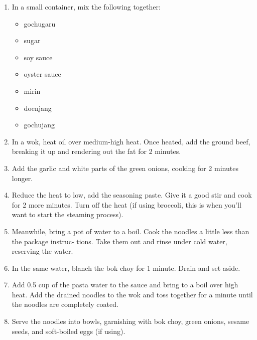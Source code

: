 \begin{enumerate}
\item In a small container, mix the following together:
\begin{itemize}
    \item gochugaru
    \item sugar
    \item soy sauce
    \item oyster sauce
    \item mirin
    \item doenjang
    \item gochujang
\end{itemize}
\item In a wok, heat oil over medium-high heat. Once heated, add the ground beef, breaking it up and rendering out the
    fat for 2 minutes.
\item Add the garlic and white parts of the green onions, cooking for 2 minutes longer.
\item Reduce the heat to low, add the seasoning paste. Give it a good stir and cook for 2 more minutes.  Turn off the
    heat (if using broccoli, this is when you’ll want to start the steaming process).
\item Meanwhile, bring a pot of water to a boil. Cook the noodles a little less than the package instruc- tions. Take
    them out and rinse under cold water, reserving the water.
\item In the same water, blanch the bok choy for 1 minute. Drain and set aside.
\item Add 0.5 cup of the pasta water to the sauce and bring to a boil over high heat. Add the drained noodles to the wok
    and toss together for a minute until the noodles are completely coated.
\item Serve the noodles into bowls, garnishing with bok choy, green onions, sesame seeds, and soft-boiled eggs (if
    using).
\end{enumerate}
